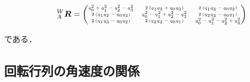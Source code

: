 \begin{description}
  \begin{equation}
    {}^{W}_{A}\boldsymbol{R} =
    {\tiny
      \begin{pmatrix}
        q_0^2+q_1^2-q_2^2-q_3^2 & 2\left(q_1 q_2 + q_0 q_3\right) & 2\left(q_1 q_3 - q_0 q_2\right)\\
        2\left(q_1 q_2 - q_0 q_3\right) & q_0^2-q_1^2+q_2^2-q_3^2 & 2\left(q_2 q_3 - q_0 q_1\right)\\
        2\left(q_1 q_3 - q_0 q_2\right) & 2\left(q_2 q_3 - q_0 q_1\right) & q_0^2-q_1^2-q_2^2+q_3^2
      \end{pmatrix}
    }
  \end{equation}
\end{description}

である．

\subsection{回転行列の角速度の関係}\label{subsec:gyro}

